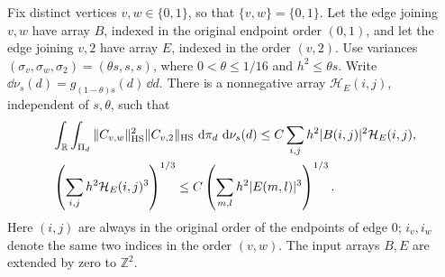 \begin{lemma}
\label{lem:frequency-boundary}
Fix distinct vertices $v,w\in\{0,1\}$, so that $\{v,w\}=\{0,1\}$.
Let the edge joining $v,w$ have array $B$, indexed in the original
endpoint order $(0,1)$, and let the edge joining $v,2$ have array $E$,
indexed in the order $(v,2)$.  Use variances
$(\sigma_v,\sigma_w,\sigma_2)=(\theta s,s,s)$, where
$0<\theta\leq1/16$ and $h^2\leq\theta s$.  Write
$\dd\nu_s(d)=g_{(1-\theta)s}(d)\,\dd d$.
There is a nonnegative array $\mathcal H_E(i,j)$, independent of
$s,\theta$, such that
\begin{align}
 &\int_{\mathbb R}\int_{\Pi_d}
       \|C_{v,w}\|_{\mathrm{HS}}^2\|C_{v,2}\|_{\mathrm{HS}}
                  \,\,\mathrm d\pi_d\,\,\mathrm d\nu_s(d)
 \leq C\sum_{i,j}h^2|B(i,j)|^2\mathcal H_E(i,j),
 \label{eq:frequency-boundary-mixed}\\
 &\left(\sum_{i,j}h^2\mathcal H_E(i,j)^3\right)^{1/3}
 \leq C\left(\sum_{m,l}h^2|E(m,l)|^3\right)^{1/3}.
 \label{eq:frequency-boundary-norm}
\end{align}
Here $(i,j)$ are always in the original order of the endpoints of
edge $0$; $i_v,i_w$ denote the same two indices in the order $(v,w)$.
The input arrays $B,E$ are extended by zero to $\mathbb Z^2$.
\end{lemma}

